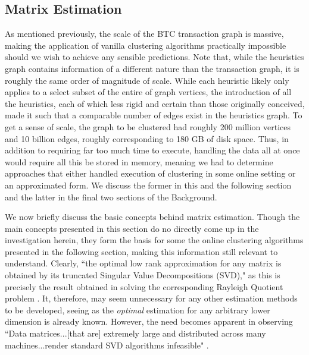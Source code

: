 \documentclass[journal]{IEEEtran}
\begin{document}
\subsection{Matrix Estimation}
As mentioned previously, the scale of the BTC transaction graph is massive, making the application of vanilla clustering algorithms practically impossible should we wish to achieve any sensible predictions. Note that, while the heuristics graph contains information of a different nature than the transaction graph, it is roughly the same order of magnitude of scale. While each heuristic likely only applies to a select subset of the entire of graph vertices, the introduction of all the heuristics, each of which less rigid and certain than those originally conceived, made it such that a comparable number of edges exist in the heuristics graph. To get a sense of scale, the graph to be clustered had roughly 200 million vertices and 10 billion edges, roughly corresponding to 180 GB of disk space. Thus, in addition to requiring far too much time to execute, handling the data all at once would require all this be stored in memory, meaning we had to determine approaches that either handled execution of clustering in some online setting or an approximated form. We discuss the former in this and the following section and the latter in the final two sections of the Background.

We now briefly discuss the basic concepts behind matrix estimation. Though the main concepts presented in this section do no directly come up in the investigation herein, they form the basis for some the online clustering algorithms presented in the following section, making this information still relevant to understand. Clearly, ``the optimal low rank approximation for any matrix is obtained by its truncated Singular Value Decompositions (SVD)," as this is precisely the result obtained in solving the corresponding Rayleigh Quotient problem \cite{sketch}. It, therefore, may seem unnecessary for any other estimation methods to be developed, seeing as the \textit{optimal} estimation for any arbitrary lower dimension is already known. However, the need becomes apparent in observing ``Data matrices...[that are] extremely large and distributed across many machines...render standard SVD algorithms infeasible" \cite{sketch}.
\end{document}
